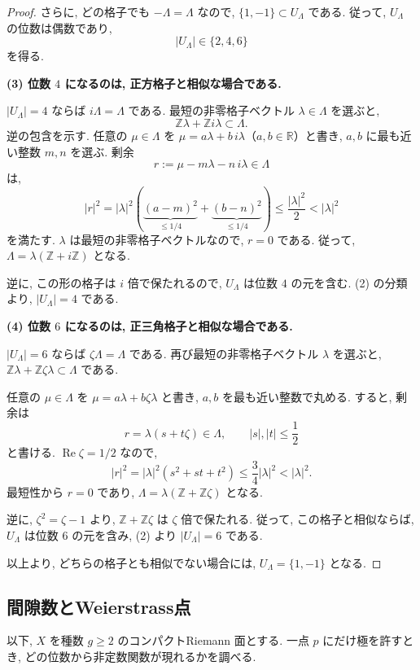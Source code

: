 \documentclass[dvipdfmx,a4paper,11pt]{article} %
\newcommand{\R}{\mathbb{R}}
\newcommand{\Z}{\mathbb{Z}}
\theoremstyle{definition}
\numberwithin{equation}{section}
\begin{document}
\begin{proof}
さらに, どの格子でも $-\Lambda=\Lambda$ なので,
$\{1,-1\}\subset U_\Lambda$ である.
従って, $U_\Lambda$ の位数は偶数であり,
\[
|U_\Lambda|\in\{2,4,6\}
\]
を得る.


\medskip
\noindent
\textbf{(3) 位数 $4$ になるのは, 正方格子と相似な場合である.}

$|U_\Lambda|=4$ ならば $i\Lambda=\Lambda$ である.
最短の非零格子ベクトル $\lambda\in\Lambda$ を選ぶと,
\[
\Z\lambda+\Z i\lambda\subset\Lambda.
\]
逆の包含を示す.
任意の $\mu\in\Lambda$ を
$\mu=a\lambda+b\,i\lambda$（$a,b\in\R$）と書き,
$a,b$ に最も近い整数 $m,n$ を選ぶ.
剰余
\[
r:=\mu-m\lambda-n\,i\lambda\in\Lambda
\]
は,
\[
|r|^2
=|\lambda|^2
\left(\underbrace{(a-m)^2}_{\leq1/4}
+\underbrace{(b-n)^2}_{\leq1/4}\right)
\leq\frac{|\lambda|^2}{2}
<|\lambda|^2
\]
を満たす.
$\lambda$ は最短の非零格子ベクトルなので, $r=0$ である.
従って,
$\Lambda=\lambda(\Z+i\Z)$ となる.

逆に, この形の格子は $i$ 倍で保たれるので,
$U_\Lambda$ は位数 $4$ の元を含む.
(2) の分類より, $|U_\Lambda|=4$ である.

\medskip
\noindent
\textbf{(4) 位数 $6$ になるのは, 正三角格子と相似な場合である.}

$|U_\Lambda|=6$ ならば $\zeta\Lambda=\Lambda$ である.
再び最短の非零格子ベクトル $\lambda$ を選ぶと,
$\Z\lambda+\Z\zeta\lambda\subset\Lambda$ である.

任意の $\mu\in\Lambda$ を
$\mu=a\lambda+b\zeta\lambda$ と書き,
$a,b$ を最も近い整数で丸める.
すると, 剰余は
\[
r=\lambda(s+t\zeta)\in\Lambda,
\qquad |s|,|t|\leq\frac12
\]
と書ける.
$\operatorname{Re}\zeta=1/2$ なので,
\[
|r|^2
=|\lambda|^2(s^2+st+t^2)
\leq\frac34|\lambda|^2
<|\lambda|^2.
\]
最短性から $r=0$ であり,
$\Lambda=\lambda(\Z+\Z\zeta)$ となる.

逆に, $\zeta^2=\zeta-1$ より,
$\Z+\Z\zeta$ は $\zeta$ 倍で保たれる.
従って, この格子と相似ならば,
$U_\Lambda$ は位数 $6$ の元を含み,
(2) より $|U_\Lambda|=6$ である.

以上より, どちらの格子とも相似でない場合には,
$U_\Lambda=\{1,-1\}$ となる.
\end{proof}




\subsection{間隙数とWeierstrass点}

以下, $X$ を種数 $g\geq2$ のコンパクトRiemann 面とする.
一点 $p$ にだけ極を許すとき, 
どの位数から非定数関数が現れるかを調べる.
\end{document}
